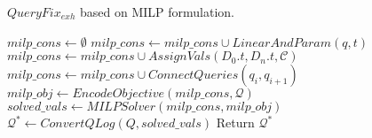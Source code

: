 \begin{algorithm}[htbp]
\caption{$QueryFix_{exh}$ based on MILP formulation.}
\label{alg:basic}
\scriptsize
\begin{algorithmic}
\STATE $milp\_cons \leftarrow \emptyset$
\STATE $milp\_cons \leftarrow milp\_cons \cup LinearAndParam(q, t)$
\ENDFOR
\STATE $milp\_cons \leftarrow milp\_cons \cup AssignVals(D_0.t, D_n.t, \mathcal{C})$
\STATE $milp\_cons \leftarrow milp\_cons \cup ConnectQueries(q_i, q_{i+1})$
\ENDFOR
\ENDFOR 
\STATE $milp\_obj \leftarrow EncodeObjective(milp\_cons, \mathcal{Q})$
\STATE $solved\_vals \leftarrow MILPSolver(milp\_cons, milp\_obj)$
\STATE $\mathcal{Q}^* \leftarrow ConvertQLog(Q, solved\_vals)$
\STATE Return $\mathcal{Q}^*$
\end{algorithmic}
\end{algorithm}



















